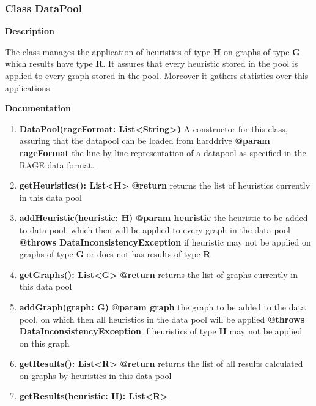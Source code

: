 \documentclass{article}
\newcommand{\myclass}[1]{\subsubsection*{Class #1} \label{#1} \addcontentsline{toc}{subsubsection}{\nameref{#1}}}
\begin{document}
	\myclass{DataPool}
	\textbf{Description}
	
	The class manages the application of heuristics of type \textbf{H} on graphs of type \textbf{G} which results have type \textbf{R}. It assures that every heuristic stored in the pool is applied to every graph stored in the pool. Moreover it gathers statistics over this applications.
	
	\textbf{Documentation}
	\begin{enumerate}[+]
		\item{
			\textbf{DataPool(rageFormat: List<String>)} \newline
			A constructor for this class, assuring that the datapool can be loaded from harddrive \newline
			\textbf{@param rageFormat} the line by line representation of a datapool as specified in the RAGE data format.
		}
		\item{
			\textbf{getHeuristics(): List<H>} \newline
			\textbf{@return} returns the list of heuristics currently in this data pool
		}
		\item{
			\textbf{addHeuristic(heuristic: H)} \newline
			\textbf{@param heuristic} the heuristic to be added to data pool, which then will be applied to every graph in the data pool \newline
			\textbf{@throws DataInconsistencyException} if heuristic may not be applied on graphs of type \textbf{G} or does not has results of type \textbf{R}
		}
		\item{
			\textbf{getGraphs(): List<G>} \newline
			\textbf{@return} returns the list of graphs currently in this data pool
		}
		\item{
			\textbf{addGraph(graph: G)} \newline
			\textbf{@param graph} the graph to be added to the data pool, on which then all heuristics in the data pool will be applied \newline
			\textbf{@throws DataInconsistencyException} if heuristics of type \textbf{H} may not be applied on this graph
		}
		\item{
			\textbf{getResults(): List<R>} \newline
			\textbf{@return} returns the list of all results calculated on graphs by heuristics in this data pool
		}
		\item{
			\textbf{getResults(heuristic: H): List<R>} \newline
}
\end{enumerate}
\end{document}
